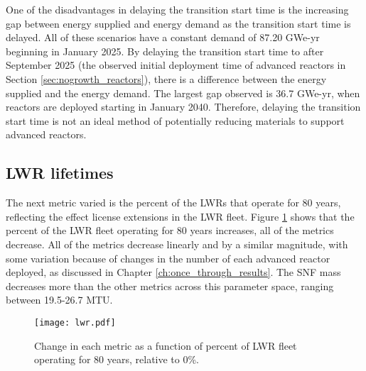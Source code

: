 One of the disadvantages in delaying the transition start time is the 
increasing gap between energy supplied and energy demand as the transition 
start time is delayed. All of these scenarios have a constant demand 
of 87.20 GWe-yr beginning in January 2025. By delaying the transition start 
time to after September 2025 (the observed initial deployment time of advanced 
reactors in Section \ref{sec:nogrowth_reactors}), there is a difference
between the energy supplied and the energy demand. The largest gap observed 
is 36.7
GWe-yr, when reactors are deployed starting in January 2040. Therefore, 
delaying the transition start time is not an ideal method of 
potentially reducing materials to support advanced reactors. 

\subsection{LWR lifetimes}
The next metric varied is the percent of the \glspl{LWR} that operate for 
80 years, reflecting the effect license extensions in the \gls{LWR} fleet. 
Figure \ref{fig:lwr_scenario7} shows that the percent of the \gls{LWR} 
fleet operating for 80 years increases, all of the metrics decrease. 
All of the metrics decrease 
linearly and by a similar magnitude, with some variation because 
of changes in the number of each advanced reactor deployed, as discussed 
in Chapter \ref{ch:once_through_results}. The \gls{SNF} mass decreases 
more than the other metrics across 
this parameter space, ranging between 19.5-26.7 MTU.

\begin{figure}[h!]
    \centering
    \texttt{[image: lwr.pdf]}
    \caption{Change in each metric as a function of percent of LWR fleet  
    operating for 80 years, relative to 0\%.}
    \label{fig:lwr_scenario7}
\end{figure}

